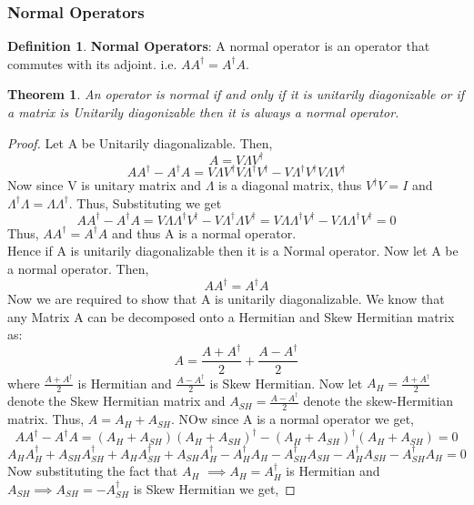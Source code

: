 \documentclass[12pt, oneside]{book}
\newtheorem{theorem}{Theorem}[section]
\theoremstyle{definition}
\newtheorem{definition}{Definition}[section]
\theoremstyle{definition}
\theoremstyle{remark}
\begin{document}
\subsubsection{Normal Operators}
\begin{definition}
\textbf{Normal Operators}: A normal operator is an operator that commutes with its adjoint. i.e. $AA^{\dagger}=A^{\dagger}A$.\\
\end{definition}
\begin{theorem}
    An operator is normal if and only if it is unitarily diagonizable or if a matrix is Unitarily diagonizable then it is always a normal operator.
\end{theorem}
\begin{proof}
    Let A be Unitarily diagonalizable. Then,
    \[ A=V\Lambda V^{\dagger} \]
    \[ AA^{\dagger} - A^{\dagger}A  = V\Lambda V^{\dagger} V \Lambda^{\dagger} V^{\dagger} - V\Lambda^{\dagger} V^{\dagger} V\Lambda V^{\dagger} \]
    Now since V is unitary matrix and $\Lambda$ is a diagonal matrix, thus $V^{\dagger}V=I$ and $\Lambda^{\dagger}\Lambda=\Lambda \Lambda^{\dagger}$. Thus, Substituting we get
    \[ AA^{\dagger} - A^{\dagger}A = V\Lambda \Lambda^{\dagger} V^{\dagger} - V\Lambda^{\dagger} \Lambda V^{\dagger} = V\Lambda \Lambda^{\dagger} V^{\dagger} - V\Lambda \Lambda^{\dagger} V^{\dagger} = 0 \]
    Thus, $AA^{\dagger}=A^{\dagger}A$ and thus A is a normal operator.\\
    Hence if A is unitarily diagonalizable then it is a Normal operator.
    Now let A be a normal operator. Then,
    \[ AA^{\dagger}=A^{\dagger}A \]
    Now we are required to show that A is unitarily diagonalizable. We know that any Matrix A can be decomposed onto a Hermitian and Skew Hermitian matrix as:
    \[ A=\frac{A+A^{\dagger}}{2} + \frac{A-A^{\dagger}}{2} \]
    where $\frac{A+A^{\dagger}}{2}$ is Hermitian and $\frac{A-A^{\dagger}}{2}$ is Skew Hermitian.
    Now let $A_H=\frac{A+A^{\dagger}}{2}$ denote the Skew Hermitian matrix and $A_{SH}=\frac{A-A^{\dagger}}{2}$ denote the skew-Hermitian matrix.
    Thus, $A=A_H+A_{SH}$. NOw since A is a normal operator we get,
    \[ AA^{\dagger}-A^{\dagger}A=(A_H + A_{SH})(A_H + A_{SH})^{\dagger}-(A_H + A_{SH})^{\dagger}(A_H + A_{SH})=0 \]
    \[ A_HA_H^{\dagger}+A_{SH}A_{SH}^{\dagger}+A_HA_{SH}^{\dagger}+A_{SH}A_H^{\dagger}-A_H^{\dagger}A_H-A_{SH}^{\dagger}A_{SH}-A_H^{\dagger}A_{SH}-A_{SH}^{\dagger}A_H=0 \]
    Now substituting the fact that $A_H$ $\implies A_{H}=A_H^{\dagger}$ is Hermitian and $A_{SH} \implies A_{SH}=-A_{SH}^{\dagger}$ is Skew Hermitian we get,

\end{proof}
\end{document}
